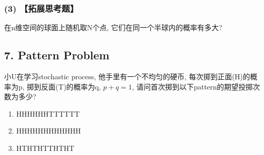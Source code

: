 \documentclass[UTF8]{ctexart}
\begin{document}
\subsubsection*{(3) 【拓展思考题】}
在n维空间的球面上随机取N个点, 它们在同一个半球内的概率有多大?

\subsection*{7. Pattern Problem}
小U在学习stochastic process, 他手里有一个不均匀的硬币, 每次掷到正面(H)的概率为p, 掷到反面(T)的概率为q, $p+q=1$, 请问首次掷到以下pattern的期望投掷次数为多少?
\begin{enumerate}
    \item HHHHHHTTTTTT
    \item HHHHHHHHHHHH
    \item HTHTHTTHTHT
\end{enumerate}
\end{document}
